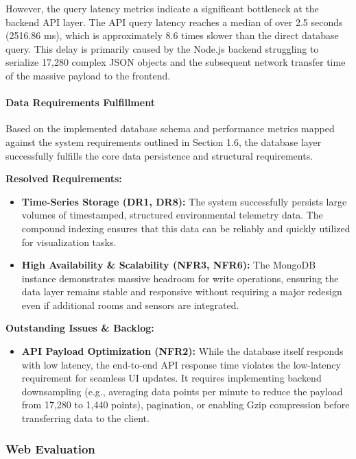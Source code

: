 However, the query latency metrics indicate a significant bottleneck at the backend API layer. The API query latency reaches a median of over 2.5 seconds (2516.86 ms), which is approximately 8.6 times slower than the direct database query. This delay is primarily caused by the Node.js backend struggling to serialize 17,280 complex JSON objects and the subsequent network transfer time of the massive payload to the frontend.

\paragraph{Data Requirements Fulfillment} 
Based on the implemented database schema and performance metrics mapped against the system requirements outlined in Section 1.6, the database layer successfully fulfills the core data persistence and structural requirements. 

\textbf{Resolved Requirements:}
\begin{itemize}
    \item \textbf{Time-Series Storage (DR1, DR8):} The system successfully persists large volumes of timestamped, structured environmental telemetry data. The compound indexing ensures that this data can be reliably and quickly utilized for visualization tasks.
    \item \textbf{High Availability \& Scalability (NFR3, NFR6):} The MongoDB instance demonstrates massive headroom for write operations, ensuring the data layer remains stable and responsive without requiring a major redesign even if additional rooms and sensors are integrated.
\end{itemize}

\textbf{Outstanding Issues \& Backlog:}
\begin{itemize}
    \item \textbf{API Payload Optimization (NFR2):} While the database itself responds with low latency, the end-to-end API response time violates the low-latency requirement for seamless UI updates. It requires implementing backend downsampling (e.g., averaging data points per minute to reduce the payload from 17,280 to 1,440 points), pagination, or enabling Gzip compression before transferring data to the client.
\end{itemize}


\subsubsection{Web Evaluation}

